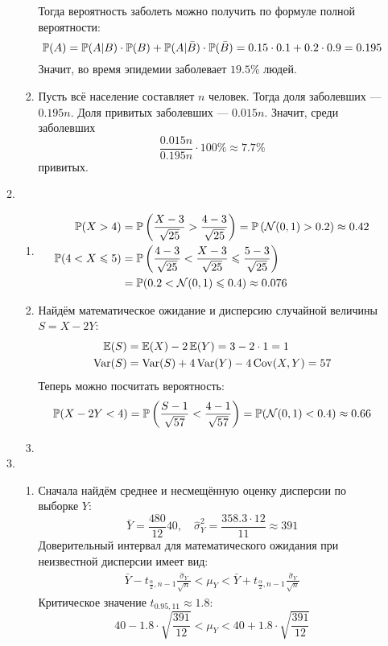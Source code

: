 \begin{enumerate}[resume]
\begin{enumerate}
\begin{enumerate}
Тогда вероятность заболеть можно получить по формуле полной вероятности:
\[
\P(A) = \P(A | B) \cdot \P(B)  + \P(A | \bar B) \cdot \P(\bar B) = 0.15 \cdot 0.1 + 0.2 \cdot 0.9 = 0.195
\]
Значит, во время эпидемии заболевает $19.5\%$ людей.
\item Пусть всё население составляет $n$ человек.
Тогда доля заболевших — $0.195 n$.
Доля привитых заболевших — $0.015 n$.
Значит, среди заболевших
\[
\frac{0.015 n}{0.195 n} \cdot 100 \% \approx 7.7 \%
\]
привитых.
\end{enumerate}
\item
\begin{enumerate}
\item
\begin{align*}
\P(X > 4) &= \P\left(\frac{X - 3}{\sqrt{25}} > \frac{4 - 3}{\sqrt{25}} \right) = \P\left(\cN(0,1) > 0.2\right) \approx 0.42 \\
\P(4 < X \leq 5) &= \P \left(\frac{4 - 3}{\sqrt{25}} < \frac{X - 3}{\sqrt{25}} \leq \frac{5 - 3}{\sqrt{25}} \right)  \\
&= \P(0.2 < \cN(0,1) \leq 0.4) \approx 0.076
\end{align*}
\item Найдём математическое ожидание и дисперсию случайной величины $S = X - 2Y$:
\begin{align*}
\E(S) &= \E(X) - 2\E(Y) = 3 - 2 \cdot 1 = 1 \\
\Var(S) &= \Var(S)  + 4 \Var(Y) - 4 \Cov(X, Y) = 57
\end{align*}
Теперь можно посчитать вероятность:
\[
\P(X - 2Y < 4) = \P \left(\frac{S - 1}{\sqrt{57}} < \frac{4 - 1}{\sqrt{57}} \right) = \P(\cN(0, 1) < 0.4) \approx 0.66
\]
\item
\end{enumerate}
\item
\begin{enumerate}
\item Сначала найдём среднее и несмещённую оценку дисперсии по выборке $Y$:
\[
\bar Y = \frac{480}{12} 40, \quad \hat{\sigma}^2_Y = \frac{358.3 \cdot 12}{11} \approx 391
\]
Доверительный интервал для математического ожидания при неизвестной дисперсии имеет вид:
\begin{align*}
\bar Y - t_{\frac{\alpha}{2}, n-1} \frac{\hat{\sigma}_Y}{\sqrt{n}} < \mu_Y < \bar Y + t_{\frac{\alpha}{2}, n-1} \frac{\hat{\sigma}_Y}{\sqrt{n}}
\end{align*}
Критическое значение $t_{0.95, 11} \approx 1.8$:
\[
40 - 1.8 \cdot \sqrt{\frac{391}{12}} < \mu_Y < 40 + 1.8 \cdot \sqrt{\frac{391}{12}}
\]
\end{enumerate}
\end{enumerate}
\end{enumerate}
